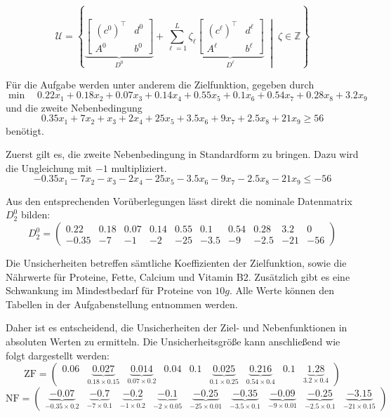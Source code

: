\documentclass[a4paper,12pt]{article}
\begin{document}
\[
\mathcal{U} = \left\{
\underbrace{
\left[
\begin{array}{c|c}
(c^0)^\top & d^0 \\ \hline
A^0 & b^0
\end{array}
\right]
}_{D^0}
+ \sum_{\ell=1}^L \zeta_\ell
\underbrace{
\left[
\begin{array}{c|c}
(c^\ell)^\top & d^\ell \\ \hline
A^\ell & b^\ell
\end{array}
\right]
}_{D^\ell}
\;\middle|\; \zeta \in \mathbb{Z}
\right\}
\]

F\"ur die Aufgabe werden unter anderem die Zielfunktion, gegeben durch
\[
    \min \quad 0.22x_1 + 0.18x_2 + 0.07x_3 + 0.14x_4 + 0.55x_5 + 0.1x_6 + 0.54x_7 + 0.28x_8 + 3.2x_9
\]
und die zweite Nebenbedingung 
\[
0.35x_1 + 7x_2 + x_3 + 2x_4 + 25x_5 + 3.5x_6 + 9x_7 + 2.5x_8 + 21x_9 \geq 56
\]
ben\"otigt.

Zuerst gilt es, die zweite Nebenbedingung in Standardform zu bringen. Dazu wird die Ungleichung mit $-1$ multipliziert.
\[
    -0.35x_1  -7x_2  -x_3  -2x_4 - 25x_5 - 3.5x_6 - 9x_7 - 2.5x_8 - 21x_9 \leq -56
\]

Aus den entsprechenden Vor\"uberlegungen l\"asst direkt die nominale Datenmatrix $D^0_2$ bilden:
\[
    D^0_2 = \begin{pmatrix}
        0.22 & 0.18 & 0.07 & 0.14 & 0.55 & 0.1 & 0.54 & 0.28 & 3.2 & 0 \\
        -0.35 & -7 & -1 & -2 & -25 & -3.5 & -9 & -2.5 & -21 & -56
    \end{pmatrix}
\]
        
Die Unsicherheiten betreffen s\"amtliche Koeffizienten der Zielfunktion, sowie die N\"ahrwerte f\"ur Proteine, Fette, Calcium und Vitamin B2. Zus\"atzlich gibt es eine Schwankung im Mindestbedarf f\"ur Proteine von $10g$. Alle Werte k\"onnen den Tabellen in der Aufgabenstellung entnommen werden.

Daher ist es entscheidend, die Unsicherheiten der Ziel- und Nebenfunktionen in absoluten Werten zu ermitteln. Die Unsicherheitsgr\"o\ss e kann anschlie\ss end wie folgt dargestellt werden:
\[
    \text{ZF} = \begin{pmatrix}
        0.06 & \underbrace{0.027}_{\mathrm{0.18 \times 0.15}} & \underbrace{0.014}_{\mathrm{0.07 \times 0.2}} & 0.04 & 0.1 & \underbrace{0.025}_{\mathrm{0.1 \times 0.25}} & \underbrace{0.216}_{\mathrm{0.54 \times 0.4}} & 0.1 & \underbrace{1.28}_{\mathrm{3.2 \times 0.4}}
    \end{pmatrix}        
\]
\[
    \text{NF} = \begin{pmatrix}
        \underbrace{-0.07}_{\mathrm{-0.35 \times 0.2}} & \underbrace{-0.7}_{\mathrm{-7 \times 0.1}} & \underbrace{-0.2}_{\mathrm{-1 \times 0.2}} & \underbrace{-0.1}_{\mathrm{-2 \times 0.05}} & \underbrace{-0.25}_{\mathrm{-25 \times 0.01}} & \underbrace{-0.35}_{\mathrm{-3.5 \times 0.1}} & \underbrace{-0.09}_{\mathrm{-9 \times 0.01}} & \underbrace{-0.25}_{\mathrm{-2.5 \times 0.1}} & \underbrace{-3.15}_{\mathrm{-21 \times 0.15}}
    \end{pmatrix}
\]
\end{document}
